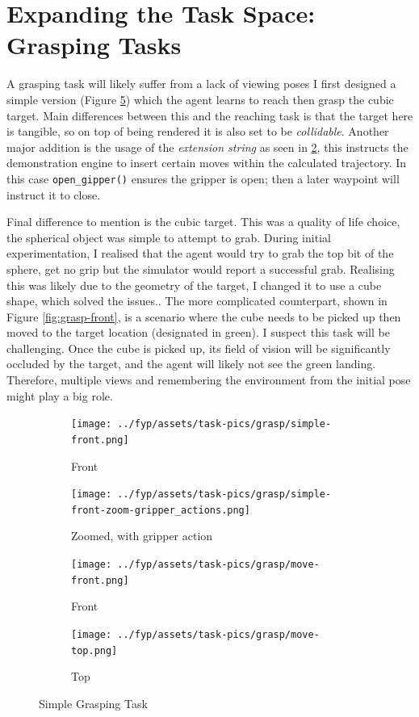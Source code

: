 \section{Expanding the Task Space: Grasping Tasks}\label{sec:grasping-tasks}
A grasping task will likely suffer from a lack of viewing poses I first designed a simple version (Figure \ref{fig:grasp}) which the agent learns to reach then grasp the cubic target. Main differences between this and the reaching task is that the target here is tangible, so on top of being rendered it is also set to be \emph{collidable}. Another major addition is the usage of the \emph{extension string} as seen in \ref{subfig:simple-zoom-actions}, this instructs the demonstration engine to insert certain moves within the calculated trajectory. In this case \verb|open_gipper()| ensures the gripper is open; then a later waypoint will instruct it to close. 

Final difference to mention is the cubic target. This was a quality of life choice, the spherical object was simple to attempt to grab. During initial experimentation, I realised that the agent would try to grab the top bit of the sphere, get no grip but the simulator would report a successful grab. Realising this was likely due to the geometry of the target, I changed it to use a cube shape, which solved the issues.\todo[color=purple]{}. The more complicated counterpart, shown in Figure \ref{fig:grasp-front}, is a scenario where the cube needs to be picked up then moved to the target location (designated in green). I suspect this task will be challenging. Once the cube is picked up, its field of vision will be significantly occluded by the target, and the agent will likely not see the green landing. Therefore, multiple views and remembering the environment from the initial pose might play a big role.

\begin{figure}[htpb] %
  \centering
  \begin{subfigure}{0.2\linewidth}
    \centering
    \texttt{[image: ../fyp/assets/task-pics/grasp/simple-front.png]}
    \caption{Front}\label{subfig:simple-front}
  \end{subfigure}
  \begin{subfigure}{0.3\linewidth}
    \centering
    \texttt{[image: ../fyp/assets/task-pics/grasp/simple-front-zoom-gripper\_actions.png]}
    \caption{Zoomed, with gripper action}\label{subfig:simple-zoom-actions}
  \end{subfigure}
  \begin{subfigure}{0.2\linewidth}
    \centering
    \texttt{[image: ../fyp/assets/task-pics/grasp/move-front.png]} 
    \caption{Front}\label{subfig:grasp-move-front}
  \end{subfigure}
  \begin{subfigure}{0.2\linewidth}
    \centering
    \texttt{[image: ../fyp/assets/task-pics/grasp/move-top.png]}
    \caption{Top}\label{subfig:grasp-move-top}
  \end{subfigure}
  \caption{Simple Grasping Task}\label{fig:grasp}
\end{figure}

